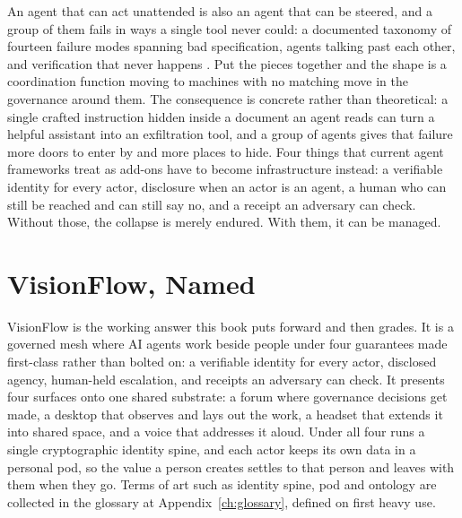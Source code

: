 An agent that can act unattended is also an agent that can be steered, and a group of them fails in ways a single tool never could: a documented taxonomy of fourteen failure modes spanning bad specification, agents talking past each other, and verification that never happens \parencite{Cemri2025}. Put the pieces together and the shape is a coordination function moving to machines with no matching move in the governance around them. The consequence is concrete rather than theoretical: a single crafted instruction hidden inside a document an agent reads can turn a helpful assistant into an exfiltration tool, and a group of agents gives that failure more doors to enter by and more places to hide. Four things that current agent frameworks treat as add-ons have to become infrastructure instead: a verifiable identity for every actor, disclosure when an actor is an agent, a human who can still be reached and can still say no, and a receipt an adversary can check. Without those, the collapse is merely endured. With them, it can be managed.

\section{VisionFlow, Named}

VisionFlow is the working answer this book puts forward and then grades. It is a governed mesh where AI agents work beside people under four guarantees made first-class rather than bolted on: a verifiable identity for every actor, disclosed agency, human-held escalation, and receipts an adversary can check. It presents four surfaces onto one shared substrate: a forum where governance decisions get made, a desktop that observes and lays out the work, a headset that extends it into shared space, and a voice that addresses it aloud. Under all four runs a single cryptographic identity spine, and each actor keeps its own data in a personal pod, so the value a person creates settles to that person and leaves with them when they go. Terms of art such as identity spine, pod and ontology are collected in the glossary at Appendix~\ref{ch:glossary}, defined on first heavy use.

